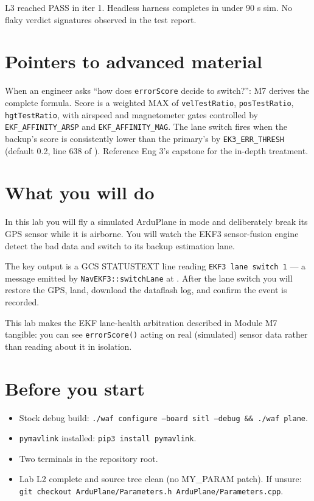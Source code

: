 \documentclass[a4paper,11pt,twoside]{article}
\renewcommand{\insttiming}[1]{\ifinstructor\begin{tcolorbox}[colback=orange!5!white,colframe=orange!50!black,title=Pacing,breakable]#1\end{tcolorbox}\fi}
\renewcommand{\instadvanced}[1]{\ifinstructor\begin{tcolorbox}[colback=violet!5!white,colframe=violet!50!black,title=Advanced material pointer,breakable]#1\end{tcolorbox}\fi}
\begin{document}
\insttiming{L3 reached PASS in iter 1. Headless harness completes in under 90 s sim. No flaky verdict signatures observed in the test report.}

\section*{Pointers to advanced material}

\instadvanced{When an engineer asks ``how does \texttt{errorScore} decide to switch?'': M7 derives the complete formula. Score is a weighted MAX of \texttt{velTestRatio}, \texttt{posTestRatio}, \texttt{hgtTestRatio}, with airspeed and magnetometer gates controlled by \texttt{EKF\_AFFINITY\_ARSP} and \texttt{EKF\_AFFINITY\_MAG}. The lane switch fires when the backup's score is consistently lower than the primary's by \texttt{EK3\_ERR\_THRESH} (default 0.2, line 638 of \codepath{AP\_NavEKF3.cpp}). Reference Eng 3's capstone for the in-depth treatment.}

\else

\section*{What you will do}

In this lab you will fly a simulated ArduPlane in  mode and deliberately break its GPS sensor while it is airborne. You will watch the EKF3 sensor-fusion engine detect the bad data and switch to its backup estimation lane.

The key output is a GCS STATUSTEXT line reading \texttt{EKF3 lane switch 1} --- a message emitted by \texttt{NavEKF3::switchLane} at . After the lane switch you will restore the GPS, land, download the dataflash log, and confirm the event is recorded.

This lab makes the EKF lane-health arbitration described in Module M7 tangible: you can see \texttt{errorScore()} acting on real (simulated) sensor data rather than reading about it in isolation.

\section*{Before you start}

\begin{itemize}
  \item Stock debug build: \texttt{./waf configure --board sitl --debug \&\& ./waf plane}.
  \item \texttt{pymavlink} installed: \texttt{pip3 install pymavlink}.
  \item Two terminals in the repository root.
  \item Lab L2 complete and source tree clean (no MY\_PARAM patch). If unsure: \texttt{git checkout ArduPlane/Parameters.h ArduPlane/Parameters.cpp}.
\end{itemize}
\end{document}
